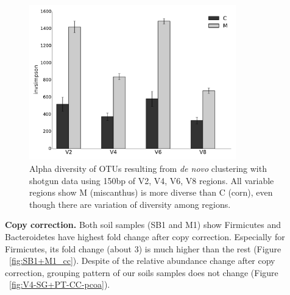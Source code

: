 \documentclass[12pt]{article}
\begin{document}
\begin{figure}[tbph!]
  \centering
  \includegraphics[width=0.8\textwidth]{figs/compare_vregion_alpha.pdf}
  \caption[Alpha diversity of OTUs resulting from {\em de novo} clustering with shotgun data using 150bp of V2, V4, V6, V8 regions]{Alpha diversity of OTUs resulting from {\em de novo} clustering with shotgun data using 150bp of V2, V4, V6, V8 regions. All variable regions show M (miscanthus) is more diverse than C (corn), even though there are variation of diversity among regions.}
  \label{fig:compare_vregion_alpha}
\end{figure}

{\bf Copy correction. } 
Both soil samples (SB1 and M1) show Firmicutes and Bacteroidetes have highest fold change after copy correction. Especially for Firmicutes, its fold change (about 3) is much higher than the rest (Figure ~\ref{fig:SB1+M1_cc}). Despite of the relative abundance change after copy correction, grouping pattern of our soils samples does not change (Figure ~\ref{fig:V4-SG+PT-CC-pcoa}).
\end{document}
